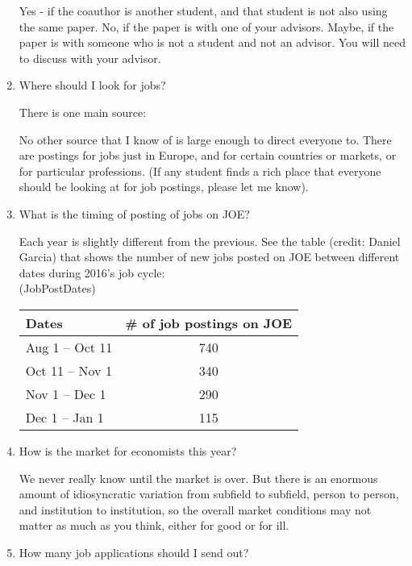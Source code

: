 \documentclass{econtex}
\providecommand\phantomsection{}
\begin{document}
\begin{enumerate}
  Yes - if the coauthor is another student, and that student is not
  also using the same paper.  No, if the paper is with one of your
  advisors.  Maybe, if the paper is with someone who is not a student
  and not an advisor.  You will need to discuss with your advisor.

\item Where should I look for jobs?

  There is one main source: \JOE

  No other source that I know of is large enough to direct everyone to. There are postings for jobs just in Europe, and for certain countries or markets, or for particular professions.  (If any student finds a rich place that everyone should be looking at for job postings, please let me know).

\item What is the timing of posting of jobs on JOE? 

  Each year is slightly different from the previous. See the table (credit: Daniel Garcia) 
 that shows the number of new jobs posted on JOE between different dates 
  during 2016's job cycle:\\

  \ifdvi\phantomsection\hypertarget{JobPostDates}{(JobPostDates)}\fi
  
\begin{table}[]
\centering
\begin{tabular}{|l|c|}
\hline
Dates                   & \# of job postings on JOE \\ \hline
Aug 1 -- Oct 11   & 740                       \\ \hline
Oct 11 -- Nov 1 & 340                       \\ \hline
Nov 1 -- Dec 1 & 290                       \\ \hline
Dec 1 -- Jan 1  & 115                       \\ \hline
\end{tabular}
\end{table}

\item How is the market for economists this year?

We never really know until the market is over.  But there is an enormous amount of idiosyncratic
variation from subfield to subfield, person to person, and institution to
institution, so the overall market conditions may not matter as much
as you think, either for good or for ill.

\item {} 
How many job applications should I send out?


\end{enumerate}
\end{document}
